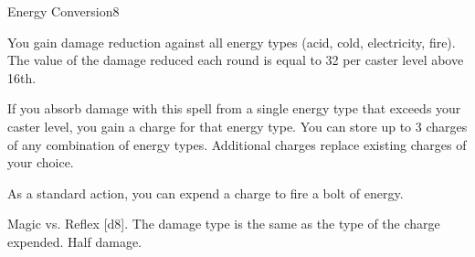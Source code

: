 \begin{spellsection}{Energy Conversion}{8}
\begin{spellheader}
\end{spellheader}
\begin{spellcontent}
    \begin{spelleffects}
        \spelleffect You gain damage reduction against all energy types (acid, cold, electricity, fire). The value of the damage reduced each round is equal to 32  per caster level above 16th.

        If you absorb damage with this spell from a single energy type that exceeds your caster level, you gain a charge for that energy type. You can store up to 3 charges of any combination of energy types. Additional charges replace existing charges of your choice.
        \spelldur \durlong
    \end{spelleffects}
\end{spellcontent}
\begin{spellsubcontent}
    \begin{spelltargetinginfo}
        \spellspecial As a standard action, you can expend a charge to fire a bolt of energy.
    \end{spelltargetinginfo}
    \begin{spelleffects}
        \begin{spellattack}{Magic vs. Reflex}
            \spellsuccess {}[d8]. The damage type is the same as the type of the charge expended.
            \spellfailure Half damage.
        \end{spellattack}
    \end{spelleffects}
\end{spellsubcontent}
\begin{spellfooter}
\end{spellfooter}
\end{spellsection}

